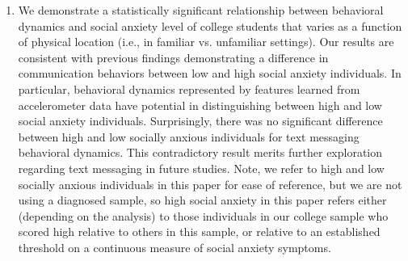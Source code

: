 \begin{enumerate}
\item We demonstrate a statistically significant relationship between behavioral dynamics and social anxiety level of college students that varies as a function of physical location (i.e., in familiar vs. unfamiliar settings). Our results are consistent with previous findings demonstrating a difference in communication behaviors between low and high social anxiety individuals. In particular, behavioral dynamics represented by features learned from accelerometer data have potential in distinguishing between high and low social anxiety individuals. Surprisingly, there was no significant difference between high and low socially anxious individuals for text messaging behavioral dynamics. This contradictory result merits further exploration regarding text messaging in future studies. Note, we refer to high and low socially anxious individuals in this paper for ease of reference, but we are not using a diagnosed sample, so high social anxiety in this paper refers either (depending on the analysis) to those individuals in our college sample who scored high relative to others in this sample, or relative to an established threshold on a continuous measure of social anxiety symptoms. 
% 
% 
% 
% 
% 


\end{enumerate}
